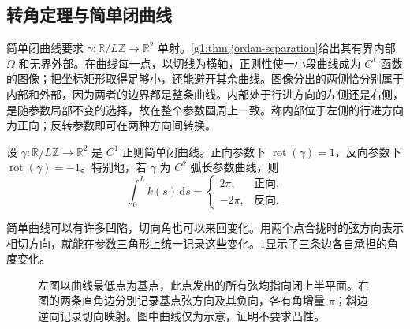 \subsection{转角定理与简单闭曲线}
\label{g1:subsec:0703:02}

简单闭曲线要求 \(\gamma:\mathbb R/L\mathbb Z\rightarrow\mathbb R^2\) 单射。\cref{g1:thm:jordan-separation}给出其有界内部 \(\Omega\) 和无界外部。在曲线每一点，以切线为横轴，正则性使一小段曲线成为 \(C^1\) 函数的图像；把坐标矩形取得足够小，还能避开其余曲线。图像分出的两侧恰分别属于内部和外部，因为两者的边界都是整条曲线。内部处于行进方向的左侧还是右侧，是随参数局部不变的选择，故在整个参数圆周上一致。称内部位于左侧的行进方向为正向；反转参数即可在两种方向间转换。

\begin{theorem}[转角定理]\label{g1:thm:turning-tangent}
	设 \(\gamma:\mathbb R/L\mathbb Z\rightarrow\mathbb R^2\) 是 \(C^1\) 正则简单闭曲线。正向参数下 \(\operatorname{rot}(\gamma)=1\)，反向参数下 \(\operatorname{rot}(\gamma)=-1\)。特别地，若 \(\gamma\) 为 \(C^2\) 弧长参数曲线，则
	\[
		\int_0^L k(s)\,\mathrm{d}s=
		\begin{cases}
			2\pi,&\text{正向},\\
			-2\pi,&\text{反向}.
		\end{cases}
	\]
\end{theorem}

简单曲线可以有许多凹陷，切向角也可以来回变化。用两个点合拢时的弦方向表示相切方向，就能在参数三角形上统一记录这些变化。\cref{g1:fig:chord-triangle}显示了三条边各自承担的角度变化。

\begin{figure}[htbp]
	\centering
	
	\caption[弦方向的参数三角形]{左图以曲线最低点为基点，此点发出的所有弦均指向闭上半平面。右图的两条直角边分别记录基点弦方向及其负向，各有角增量 \(\pi\)；斜边逆向记录切向映射。图中曲线仅为示意，证明不要求凸性。}
	\label{g1:fig:chord-triangle}
\end{figure}

